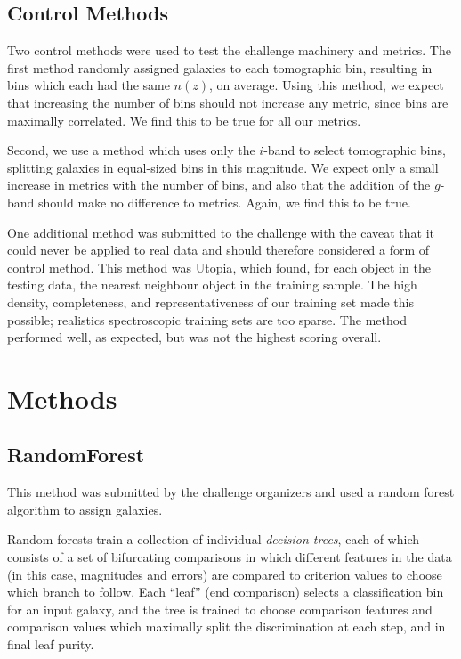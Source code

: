 \documentclass[twocolumn,twocolappendix]{aastex63}
\begin{document}
\subsection{Control Methods}

Two control methods were used to test the challenge machinery and metrics.
The first method randomly assigned galaxies to each tomographic bin, resulting
in bins which each had the same $n(z)$, on average.  Using this method, we expect
that increasing the number of bins should not increase any metric, since bins are
maximally correlated.  We find this to be true for all our metrics.

Second, we use a method which uses only the $i$-band to select tomographic bins,
splitting galaxies in equal-sized bins in this magnitude. We expect only a small
increase in metrics with the number of bins, and also that the addition of the $g$-band
should make no difference to metrics.  Again, we find this to be true.

One additional method was submitted to the challenge with the caveat that it could
never be applied to real data and should therefore considered a form of control method.
This method was {\sc Utopia}, which found, for each object in the testing data, the
nearest neighbour object in the training sample.  The high density, completeness, and
representativeness of our training set made this possible; realistics spectroscopic training
sets are too sparse.  The method performed well, as expected, 
but was not the highest scoring overall.


\section{Methods}

\subsection{ {\sc RandomForest} } \label{sec:randomforest}
This method was submitted by the challenge organizers and used a random
forest algorithm to assign galaxies.

Random forests \citep{breiman2001} train a collection of individual \emph{decision trees},
each of which consists of a set of bifurcating comparisons in which different features in
the data (in this case, magnitudes and errors) are compared to criterion values to choose
which branch to follow.  Each ``leaf'' (end comparison) selects a classification bin for
an input galaxy, and the tree is trained to choose comparison features and comparison values
which maximally split the discrimination at each step, and in final leaf purity.
\end{document}
